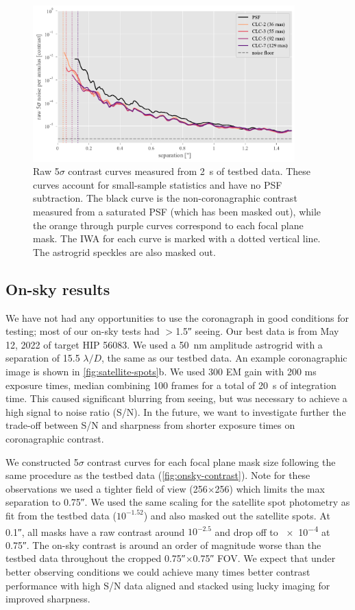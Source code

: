 \documentclass[]{spie}  %
\begin{document}
\begin{figure}
   \centering
   \includegraphics[width=0.9\textwidth]{figures/saturated_bench_20220628_curves}
   \caption{Raw 5$\sigma$ contrast curves measured from \qty{2}{\second} of testbed data. These curves account for small-sample statistics and have no PSF subtraction. The black curve is the non-coronagraphic contrast measured from a saturated PSF (which has been masked out), while the orange through purple curves correspond to each focal plane mask. The IWA for each curve is marked with a dotted vertical line. The astrogrid speckles are also masked out.}\label{fig:contrast}
\end{figure}

\subsection{On-sky results}\label{sec:onsky}

We have not had any opportunities to use the coronagraph in good conditions for testing; most of our on-sky tests had $>$\ang{;;1.5} seeing. Our best data is from May 12, 2022 of target HIP 56083. We used a \qty{50}{\nano\meter} amplitude astrogrid with a separation of 15.5 $\lambda/D$, the same as our testbed data. An example coronagraphic image is shown in \autoref{fig:satellite-spots}b. We used 300 EM gain with 200 ms exposure times, median combining 100 frames for a total of \qty{20}{\second} of integration time. This caused significant blurring from seeing, but was necessary to achieve a high signal to noise ratio (S/N). In the future, we want to investigate further the trade-off between S/N and sharpness from shorter exposure times on coronagraphic contrast.

We constructed 5$\sigma$ contrast curves for each focal plane mask size following the same procedure as the testbed data (\autoref{fig:onsky-contrast}). Note for these observations we used a tighter field of view (256$\times$256) which limits the max separation to \ang{;;0.75}. We used the same scaling for the satellite spot photometry as fit from the testbed data ($10^{-1.52}$) and also masked out the satellite spots. At \ang{;;0.1}, all masks have a raw contrast around $10^{-2.5}$ and drop off to \num{e-4} at \ang{;;0.75}. The on-sky contrast is around an order of magnitude worse than the testbed data throughout the cropped \ang{;;0.75}$\times$\ang{;;0.75} FOV. We expect that under better observing conditions we could achieve many times better contrast performance with high S/N data aligned and stacked using lucky imaging for improved sharpness.
\end{document}
